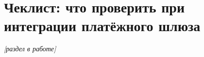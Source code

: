 
\chapter{Чеклист: что проверить при интеграции платёжного шлюза}
\label{app:integration-checklist}

\textit{[раздел в работе]}
